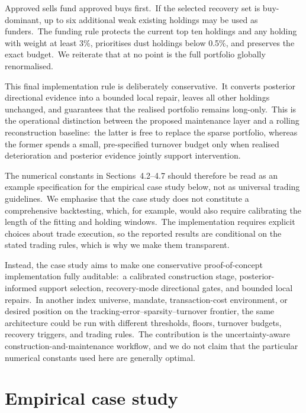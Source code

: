 \documentclass[11pt]{article}
\begin{document}
Approved sells fund approved buys first.\ If the selected recovery set is buy-dominant, up to six additional weak existing holdings may be used as funders.\ The funding rule protects the current top ten holdings and any holding with weight at least 3\%, prioritises dust holdings below 0.5\%, and preserves the exact budget.\ We reiterate that at no point is the full portfolio globally renormalised.

This final implementation rule is deliberately conservative.\ It converts posterior directional evidence into a bounded local repair, leaves all other holdings unchanged, and guarantees that the realised portfolio remains long-only.\ This is the operational distinction between the proposed maintenance layer and a rolling reconstruction baseline:\ the latter is free to replace the sparse portfolio, whereas the former spends a small, pre-specified turnover budget only when realised deterioration and posterior evidence jointly support intervention.

The numerical constants in Sections~4.2--4.7 should therefore be read as an example specification for the empirical case study below, not as universal trading guidelines.\ We emphasise that the case study does not constitute a comprehensive backtesting, which, for example, would also require calibrating the length of the fitting and holding windows.\ The implementation requires explicit choices about trade execution, so the reported results are conditional on the stated trading rules, which is why we make them transparent.

 Instead, the case study aims to make one conservative proof-of-concept implementation fully auditable:\ a calibrated construction stage, posterior-informed support selection, recovery-mode directional gates, and bounded local repairs.\ In another index universe, mandate, transaction-cost environment, or desired position on the tracking-error--sparsity--turnover frontier, the same architecture could be run with different thresholds, floors, turnover budgets, recovery triggers, and trading rules.\ The contribution is the uncertainty-aware construction-and-maintenance workflow, and we do not claim that the particular numerical constants used here are generally optimal.




\section{Empirical case study}\label{sec:case-study}
\end{document}
